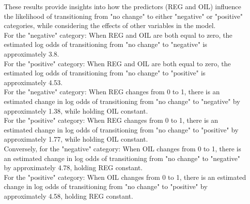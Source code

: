 \documentclass[oneside]{article}
\begin{document}
These results provide insights into how the predictors (REG and OIL) influence the likelihood of transitioning from "no change" to either "negative" or "positive" categories, while considering the effects of other variables in the model.
\\
For the "negative" category: When REG and OIL are both equal to zero, the estimated log odds of transitioning from "no change" to "negative" is approximately 3.8.
\\
For the "positive" category: When REG and OIL are both equal to zero, the estimated log odds of transitioning from "no change" to "positive" is approximately 4.53.
\\
For the "negative" category: When REG changes from 0 to 1, there is an estimated change in log odds of transitioning from "no change" to "negative" by approximately 1.38, while holding OIL constant.
\\
For the "positive" category: When REG changes from 0 to 1, there is an estimated change in log odds of transitioning from "no change" to "positive" by approximately 1.77, while holding OIL constant.
\\
Conversely, for the "negative" category: When OIL changes from 0 to 1, there is an estimated change in log odds of transitioning from "no change" to "negative" by approximately 4.78, holding REG constant.
\\
For the "positive" category: When OIL changes from 0 to 1, there is an estimated change in log odds of transitioning from "no change" to "positive" by approximately 4.58, holding REG constant.
\end{document}
